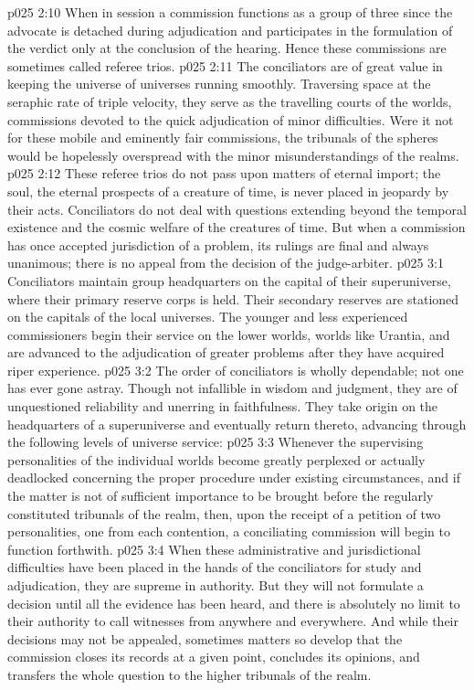 \vs p025 2:10 \pc When in session a commission functions as a group of three since the advocate is detached during adjudication and participates in the formulation of the verdict only at the conclusion of the hearing. Hence these commissions are sometimes called referee trios.
\vs p025 2:11 \pc The conciliators are of great value in keeping the universe of universes running smoothly. Traversing space at the seraphic rate of triple velocity, they serve as the travelling courts of the worlds, commissions devoted to the quick adjudication of minor difficulties. Were it not for these mobile and eminently fair commissions, the tribunals of the spheres would be hopelessly overspread with the minor misunderstandings of the realms.
\vs p025 2:12 These referee trios do not pass upon matters of eternal import; the soul, the eternal prospects of a creature of time, is never placed in jeopardy by their acts. Conciliators do not deal with questions extending beyond the temporal existence and the cosmic welfare of the creatures of time. But when a commission has once accepted jurisdiction of a problem, its rulings are final and always unanimous; there is no appeal from the decision of the judge\hyp{}arbiter.
\vs p025 3:1 Conciliators maintain group headquarters on the capital of their superuniverse, where their primary reserve corps is held. Their secondary reserves are stationed on the capitals of the local universes. The younger and less experienced commissioners begin their service on the lower worlds, worlds like Urantia, and are advanced to the adjudication of greater problems after they have acquired riper experience.
\vs p025 3:2 The order of conciliators is wholly dependable; not one has ever gone astray. Though not infallible in wisdom and judgment, they are of unquestioned reliability and unerring in faithfulness. They take origin on the headquarters of a superuniverse and eventually return thereto, advancing through the following levels of universe service:
\vs p025 3:3 \bibnobreakspace {} Whenever the supervising personalities of the individual worlds become greatly perplexed or actually deadlocked concerning the proper procedure under existing circumstances, and if the matter is not of sufficient importance to be brought before the regularly constituted tribunals of the realm, then, upon the receipt of a petition of two personalities, one from each contention, a conciliating commission will begin to function forthwith.
\vs p025 3:4 When these administrative and jurisdictional difficulties have been placed in the hands of the conciliators for study and adjudication, they are supreme in authority. But they will not formulate a decision until all the evidence has been heard, and there is absolutely no limit to their authority to call witnesses from anywhere and everywhere. And while their decisions may not be appealed, sometimes matters so develop that the commission closes its records at a given point, concludes its opinions, and transfers the whole question to the higher tribunals of the realm.

